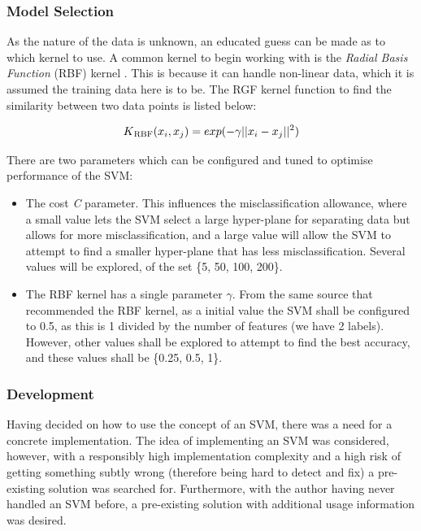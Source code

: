 \subsubsection*{Model Selection}
As the nature of the data is unknown, an educated guess can be made as to which kernel to use. A common kernel to begin working with is the \textit{Radial Basis Function} (RBF) kernel \cite{Chih-WeiHsuChih-ChungChang2008}. This is because it can handle non-linear data, which it is assumed the training data here is to be. The RGF kernel function to find the similarity between two data points is listed below:

\begin{equation*}
K\textsubscript{RBF}(x_i, x_j) = exp(-\gamma||x_i - x_j||^2)
\end{equation*}

\noindent There are two parameters which can be configured and tuned to optimise performance of the SVM:
\begin{itemize}
	\item The cost \textit{C} parameter. This influences the misclassification allowance, where a small value lets the SVM select a large hyper-plane for separating data but allows for more misclassification, and a large value will allow the SVM to attempt to find a smaller hyper-plane that has less misclassification. Several values will be explored, of the set \{5, 50, 100, 200\}.
	\item The RBF kernel has a single parameter $\gamma$. From the same source that recommended the RBF kernel, as a initial value the SVM shall be configured to 0.5, as this is 1 divided by the number of features (we have 2 labels). However, other values shall be explored to attempt to find the best accuracy, and these values shall be \{0.25, 0.5, 1\}.
\end{itemize}

\subsubsection*{Development}
Having decided on how to use the concept of an SVM, there was a need for a concrete implementation. The idea of implementing an SVM was considered, however, with a responsibly high implementation complexity and a high risk of getting something subtly wrong (therefore being hard to detect and fix) a pre-existing solution was searched for. Furthermore, with the author having never handled an SVM before, a pre-existing solution with additional usage information was desired.

